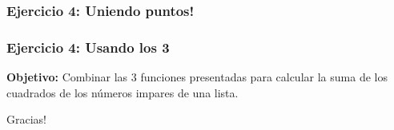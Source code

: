 \documentclass{beamer}
\begin{document}

\subsubsection{Ejercicio 4: Uniendo puntos!}
\begin{frame}[fragile]
\frametitle{Ejercicio 4: Usando los 3}
\textbf{Objetivo: } Combinar las 3 funciones presentadas para calcular la suma de los cuadrados de los números impares de una lista.
\end{frame}

\begin{emptyframe}
    Gracias!
\end{emptyframe}
\end{document}
